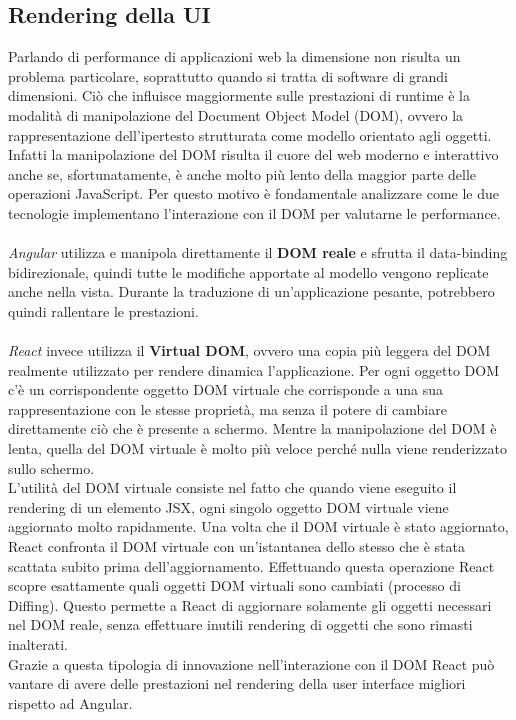 \subsection{Rendering della UI}
Parlando di performance di applicazioni web la dimensione non risulta un problema particolare, soprattutto quando si tratta di software di grandi dimensioni. Ciò che influisce maggiormente sulle prestazioni di runtime è la modalità di manipolazione del Document Object Model (DOM), ovvero la rappresentazione dell'ipertesto strutturata come modello orientato agli oggetti. Infatti la manipolazione del DOM risulta il cuore del web moderno e interattivo anche se, sfortunatamente, è anche molto più lento della maggior parte delle operazioni JavaScript. Per questo motivo è fondamentale analizzare come le due tecnologie implementano l'interazione con il DOM per valutarne le performance. \\ \\
\textit{Angular} utilizza e manipola direttamente il \textbf{DOM reale} e sfrutta il data-binding bidirezionale, quindi tutte le modifiche apportate al modello vengono replicate anche nella vista. Durante la traduzione di un'applicazione pesante, potrebbero quindi rallentare le prestazioni. \\ \\
\textit{React} invece utilizza il \textbf{Virtual DOM}, ovvero una copia più leggera del DOM realmente utilizzato per rendere dinamica l'applicazione. Per ogni oggetto DOM c'è un corrispondente oggetto DOM virtuale che corrisponde a una sua rappresentazione con le stesse proprietà, ma senza il potere di cambiare direttamente ciò che è presente a schermo. Mentre la manipolazione del DOM è lenta, quella del DOM virtuale è molto più veloce perché nulla viene renderizzato sullo schermo. \\
L'utilità del DOM virtuale consiste nel fatto che quando viene eseguito il rendering di un elemento JSX, ogni singolo oggetto DOM virtuale viene aggiornato molto rapidamente.
Una volta che il DOM virtuale è stato aggiornato, React confronta il DOM virtuale con un'istantanea dello stesso che è stata scattata subito prima dell'aggiornamento. Effettuando questa operazione React scopre esattamente quali oggetti DOM virtuali sono cambiati (processo di Diffing). Questo permette a React di aggiornare solamente gli oggetti necessari nel DOM reale, senza effettuare inutili rendering di oggetti che sono rimasti inalterati. \\
Grazie a questa tipologia di innovazione nell'interazione con il DOM React può vantare di avere delle prestazioni nel rendering della user interface migliori rispetto ad Angular.

